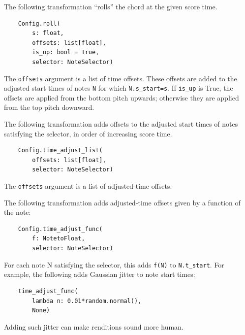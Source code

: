 \documentclass[letterpaper, 12pt]{article}
\begin{document}
The following transformation ``rolls'' the chord at the given score time.
\begin{small}\begin{singlespace}\vspace{-18px}\begin{verbatim}
    Config.roll(
        s: float,
        offsets: list[float],
        is_up: bool = True,
        selector: NoteSelector)
\end{verbatim}\end{singlespace}\end{small}\vspace{-18px}\noindent
The \texttt{offsets} argument is a list of time offsets.
These offsets are added to the adjusted start times of notes
\texttt{N} for which \texttt{N.s\_start=s}.
If \texttt{is\_up} is True, the offsets are applied from the bottom pitch upwards;
otherwise they are applied from the top pitch downward.

The following transformation adds offsets
to the adjusted start times of notes satisfying the selector,
in order of increasing score time.
\begin{small}\begin{singlespace}\vspace{-18px}\begin{verbatim}
    Config.time_adjust_list(
        offsets: list[float],
        selector: NoteSelector)
\end{verbatim}\end{singlespace}\end{small}\vspace{-18px}\noindent
The \texttt{offsets} argument is a list of adjusted-time offsets.

The following transformation adds
adjusted-time offsets given by a function of the note:
\begin{small}\begin{singlespace}\vspace{-18px}\begin{verbatim}
    Config.time_adjust_func(
        f: NotetoFloat,
        selector: NoteSelector)
\end{verbatim}\end{singlespace}\end{small}\vspace{-18px}\noindent
For each note N satisfying the selector,
this adds \texttt{f(N)} to \texttt{N.t\_start}.
For example, the following adds Gaussian jitter to note start times:
\begin{small}\begin{singlespace}\vspace{-18px}\begin{verbatim}
    time_adjust_func(
        lambda n: 0.01*random.normal(),
        None)
\end{verbatim}\end{singlespace}\end{small}\vspace{-18px}\noindent
Adding such jitter can make renditions sound more human.
\end{document}
